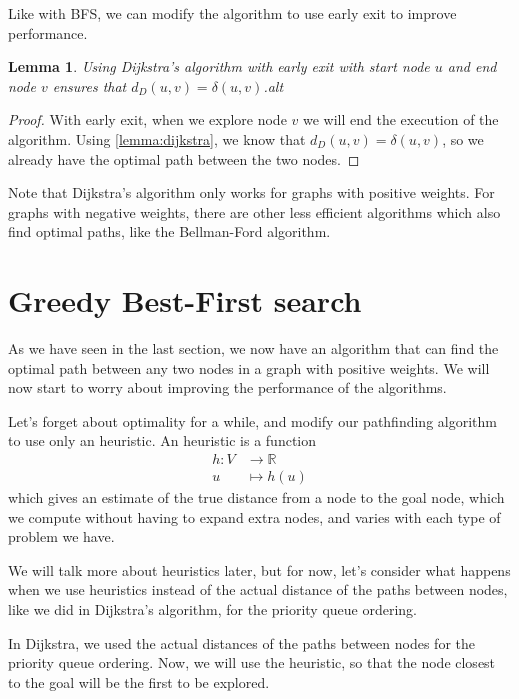 \documentclass[12pt]{report}
\newtheorem{lemma}[theorem]{Lemma}
\begin{document}
Like with BFS, we can modify the algorithm to use early exit to improve performance.
\begin{lemma}
Using Dijkstra's algorithm with early exit with start node $u$ and end node $v$ ensures that $d_D(u, v) = \delta(u, v)$.alt
\end{lemma}
\begin{proof}
With early exit, when we explore node $v$ we will end the execution of the algorithm. Using \ref{lemma:dijkstra}, we know that $d_D(u, v) = \delta(u, v)$, so we already have the optimal path between the two nodes.
\end{proof}

Note that Dijkstra's algorithm only works for graphs with positive weights. For graphs with negative weights, there are other less efficient algorithms which also find optimal paths, like the Bellman-Ford algorithm.

\section{Greedy Best-First search}
As we have seen in the last section, we now have an algorithm that can find the optimal path between any two nodes in a graph with positive weights. We will now start to worry about improving the performance of the algorithms.

Let's forget about optimality for a while, and modify our pathfinding algorithm to use only an heuristic. An heuristic is a function
\begin{align*}
	h \colon V &\to \mathbb{R}\\
	u &\mapsto h(u)
\end{align*}
which gives an estimate of the true distance from a node to the goal node, which we compute without having to expand extra nodes, and varies with each type of problem we have.

We will talk more about heuristics later, but for now, let's consider what happens when we use heuristics instead of the actual distance of the paths between nodes, like we did in Dijkstra's algorithm, for the priority queue ordering. 

In Dijkstra, we used the actual distances of the paths between nodes for the priority queue ordering. Now, we will use the heuristic, so that the node closest to the goal will be the first to be explored.
\end{document}
